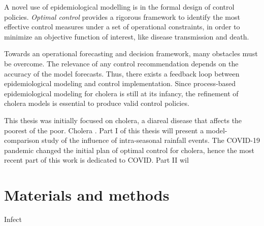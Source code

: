 A novel use of epidemiological modelling is in the formal design of control policies. \textit{Optimal control} provides a rigorous framework to identify the most effective control measures under a set of operational constraints, in order to minimize an objective function of interest, like disease transmission and death. 

Towards an operational forecasting and decision framework, many obstacles must be overcome. The relevance of any control recommendation depends on the accuracy of the model forecasts. Thus, there exists a feedback loop between epidemiological modeling and control implementation. Since process-based epidemiological modeling for cholera is still at its infancy, the refinement of cholera models is essential to produce valid control policies.

This thesis was initially focused on cholera, a diareal disease that affects the poorest of the poor. Cholera . Part I of this thesis will present a model-comparison study of the influence of intra-seasonal rainfall events. The COVID-19 pandemic changed the initial plan of optimal control for cholera, hence the most recent part of this work is dedicated to COVID. Part II wil


\chapter[Materials and methods]{Materials and methods} %

Infect

